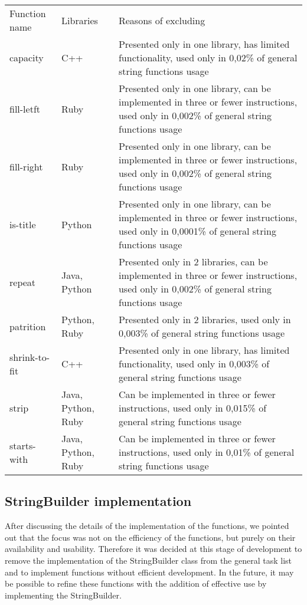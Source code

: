 \documentclass[11pt,nonacm,natbib=false]{acmart}
\begin{document}
\begin{table}[H]
\begin{tabular}{l | l | p{265pt}}
Function name & Libraries          & Reasons of excluding                                                                                                                      \\
capacity      & C++                & Presented only in one library, has limited functionality, used only in 0,02\% of general string functions usage                           \\
fill-letft    & Ruby               & Presented only in one library, can be implemented in three or fewer instructions, used only in 0,002\% of general string functions usage  \\
fill-right    & Ruby               & Presented only in one library, can be implemented in three or fewer instructions, used only in 0,002\% of general string functions usage  \\
is-title      & Python             & Presented only in one library, can be implemented in three or fewer instructions, used only in 0,0001\% of general string functions usage \\
repeat        & Java, Python       & Presented only in 2 libraries, can be implemented in three or fewer instructions, used only in 0,002\% of general string functions usage  \\
patrition     & Python, Ruby       & Presented only in 2 libraries, used only in 0,003\% of general string functions usage                                                     \\
shrink-to-fit & C++                & Presented only in one library, has limited functionality, used only in 0,003\% of general string functions usage                          \\
strip         & Java, Python, Ruby & Can be implemented in three or fewer instructions, used only in 0,015\% of general string functions usage                                 \\
starts-with   & Java, Python, Ruby & Can be implemented in three or fewer instructions, used only in 0,01\% of general string functions usage                                 
\end{tabular}
\end{table}

\subsection{StringBuilder implementation}
\begin{inparaenum}
After discussing the details of the implementation of the functions, we pointed out that the focus was not on the efficiency of the functions, but purely on their availability and usability. Therefore it was decided at this stage of development to remove the implementation of the StringBuilder class from the general task list and to implement functions without efficient development. In the future, it may be possible to refine these functions with the addition of effective use by implementing the StringBuilder.
\end{inparaenum}
   
\end{document}
